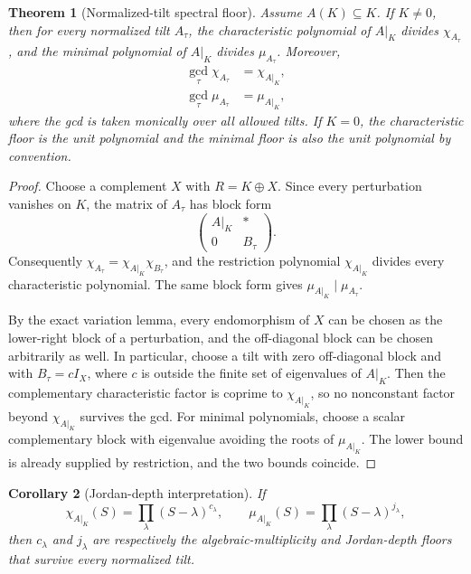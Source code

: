 \documentclass[11pt]{article}
\newtheorem{theorem}{Theorem}[section]
\newtheorem{corollary}[theorem]{Corollary}
\theoremstyle{definition}
\begin{document}
\begin{theorem}[Normalized-tilt spectral floor]
Assume \(A(K)\subseteq K\). If \(K\ne 0\), then for every normalized tilt \(A_\tau\), the characteristic polynomial of
\(A|_K\) divides \(\chi_{A_\tau}\), and the minimal polynomial of \(A|_K\) divides
\(\mu_{A_\tau}\). Moreover,
\begin{align}
\gcd_{\tau}\chi_{A_\tau}&=\chi_{A|_K},
\\
\gcd_{\tau}\mu_{A_\tau}&=\mu_{A|_K},
\end{align}
where the gcd is taken monically over all allowed tilts.
If \(K=0\), the characteristic floor is the unit polynomial and the minimal floor is also the
unit polynomial by convention.
\label{thm:floor}
\end{theorem}

\begin{proof}
Choose a complement \(X\) with \(R=K\oplus X\). Since every perturbation vanishes on \(K\),
the matrix of \(A_\tau\) has block form
\[
\begin{pmatrix}
A|_K & *\\
0 & B_\tau
\end{pmatrix}.
\]
Consequently \(\chi_{A_\tau}=\chi_{A|_K}\chi_{B_\tau}\), and the restriction polynomial
\(\chi_{A|_K}\) divides every characteristic polynomial. The same block form gives
\(\mu_{A|_K}\mid\mu_{A_\tau}\).

By the exact variation lemma, every endomorphism of \(X\) can be chosen as the lower-right block
of a perturbation, and the off-diagonal block can be chosen arbitrarily as well. In particular,
choose a tilt with zero off-diagonal block and with \(B_\tau=cI_X\), where \(c\) is outside the
finite set of eigenvalues of \(A|_K\). Then the complementary characteristic factor is coprime
to \(\chi_{A|_K}\), so no nonconstant factor beyond \(\chi_{A|_K}\) survives the gcd. For minimal
polynomials, choose a scalar complementary block with eigenvalue avoiding the roots of
\(\mu_{A|_K}\). The lower bound is already supplied by restriction, and the two bounds coincide.
\end{proof}

\begin{corollary}[Jordan-depth interpretation]
If
\[
\chi_{A|_K}(S)=\prod_\lambda(S-\lambda)^{c_\lambda},
\qquad
\mu_{A|_K}(S)=\prod_\lambda(S-\lambda)^{j_\lambda},
\]
then \(c_\lambda\) and \(j_\lambda\) are respectively the algebraic-multiplicity and
Jordan-depth floors that survive every normalized tilt.
\end{corollary}
\end{document}
